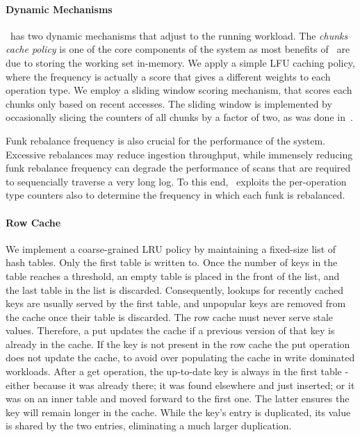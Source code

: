 \paragraph{Dynamic Mechanisms}
\sys\ has two dynamic mechanisms that adjust to the running workload. The \emph{chunks cache policy} is one of the core components of the system as most benefits of \sys\ are due to storing the working set in-memory. We apply a simple LFU caching policy,
where the frequency is actually a score that gives a different weights to each operation type.
We employ a sliding window scoring mechanism, that scores each chunks only based on recent accesses. The sliding window is implemented by occasionally slicing the counters of all chunks by a factor of two, as was done in~\cite{tinyLFU}.

Funk rebalance frequency is also crucial for the performance of the system. Excessive rebalances may reduce ingestion throughput, while immensely reducing funk rebalance frequency can degrade the performance of scans that are required to sequencially traverse a very long log. To this end, \sys\ exploits the per-operation type counters also to determine the frequency in which each funk is rebalanced.

\paragraph{Row Cache} 
We implement a coarse-grained LRU policy by maintaining a fixed-size list of hash tables. Only the first table is written to. Once the number of keys in the table reaches a threshold, an empty table is placed in the front of the list, and the last table in the list is discarded. Consequently, lookups for recently cached keys are usually served by the first table, and unpopular keys are removed from the cache once their table is discarded.
The row cache must never serve stale values. %
Therefore, a put updates the cache  if a previous version of that key is already in the cache. 
If the key is not present in the row cache the put operation does not update the cache, to avoid over populating the cache in write dominated workloads. 
After a get operation, the up-to-date key is always in the first table - either because it was already there; it was found elsewhere and just inserted; or it was on an inner table and moved forward to the first one. The latter ensures the key will remain longer in the cache. While the key's entry is duplicated, its value is shared by the two entries, eliminating a much larger duplication.

